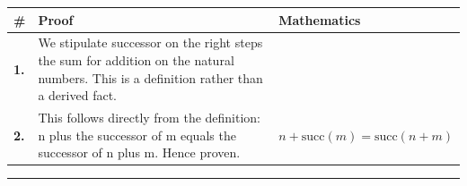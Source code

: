 \documentclass[11pt]{article}
\theoremstyle{definition}
\begin{document}
\medskip
\noindent
\begin{tabular}{@{} >{\raggedright\arraybackslash}p{} >{\raggedright\arraybackslash}p{} >{\raggedleft\arraybackslash}p{} @{}}
\textbf{\#} & \textbf{Proof} & \textbf{Mathematics} \\
\midrule
\textbf{1.} & We stipulate successor on the right steps the sum for addition on the natural numbers. This is a definition rather than a derived fact. & \\[0.45em]
\textbf{2.} & This follows directly from the definition: n plus the successor of m equals the successor of n plus m. Hence proven. & $\displaystyle n + \mathrm{succ}(m) = \mathrm{succ}(n + m)$ \\[0.45em]
\bottomrule
\end{tabular}
\label{thm:Nat-addition-successor_on_the_right_steps_the_sum}
\par\medskip\hrule
\end{document}
